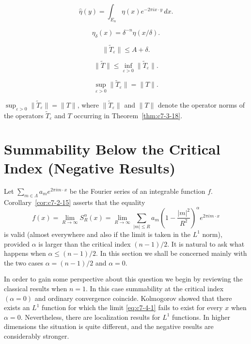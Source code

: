 \begin{equation}\label{eq:c7-3-23}
\hat{\eta}(y) = \int_{E_n} \eta(x) e^{-2\pi i x \cdot y}\,dx.
\end{equation}

\begin{equation}\label{eq:c7-3-24}
\eta_\delta(x) = \delta^{-n} \eta(x/\delta).
\end{equation}

\begin{equation}\label{eq:c7-3-25}
\|\tilde{T}_\varepsilon\| \leq A + \delta.
\end{equation}

\begin{equation}\label{eq:c7-3-26}
\|\tilde{T}\| \leq \inf_{\varepsilon > 0} \|\tilde{T}_\varepsilon\|.
\end{equation}

\begin{equation}\label{eq:c7-3-27}
\sup_{\varepsilon > 0} \|\tilde{T}_\varepsilon\| = \|T\|.
\end{equation}

\begin{corollary}\label{cor:c7-3-28}
$\sup_{\varepsilon > 0} \|\tilde{T}_\varepsilon\| = \|T\|$, where $\|\tilde{T}_\varepsilon\|$ and $\|T\|$ denote the operator norms of the operators $\tilde{T}_\varepsilon$ and $T$ occurring in Theorem~\ref{thm:c7-3-18}.
\end{corollary}

\section{Summability Below the Critical Index (Negative Results)}

Let $\sum_{m \in \Lambda} a_m e^{2\pi i m \cdot x}$ be the Fourier series of an integrable function $f$. Corollary~\ref{cor:c7-2-15} asserts that the equality
\begin{equation}\label{eq:c7-4-1}
f(x) = \lim_{R \to \infty} S_R^\alpha(x) = \lim_{R \to \infty} \sum_{|m| \leq R} a_m \left(1 - \frac{|m|^2}{R^2}\right)^\alpha e^{2\pi i m \cdot x}
\end{equation}
is valid (almost everywhere and also if the limit is taken in the $L^1$ norm), provided $\alpha$ is larger than the critical index $(n-1)/2$. It is natural to ask what happens when $\alpha \leq (n-1)/2$. In this section we shall be concerned mainly with the two cases $\alpha = (n-1)/2$ and $\alpha = 0$.

In order to gain some perspective about this question we begin by reviewing the classical results when $n = 1$. In this case summability at the critical index $(\alpha = 0)$ and ordinary convergence coincide. Kolmogorov showed that there exists an $L^1$ function for which the limit \eqref{eq:c7-4-1} fails to exist for every $x$ when $\alpha = 0$. Nevertheless, there are localization results for $L^1$ functions. In higher dimensions the situation is quite different, and the negative results are considerably stronger.

